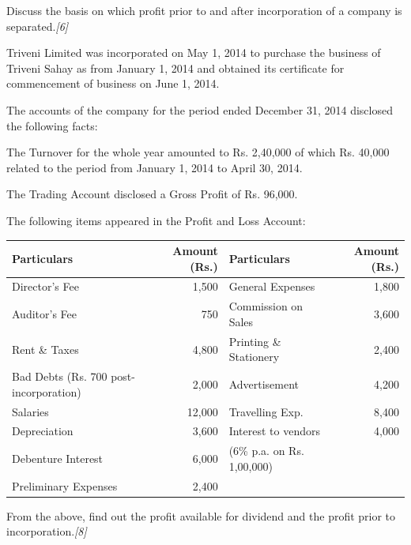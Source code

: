 \documentclass[11pt,a4paper]{article}
\newcommand{\pts}[1]{\hfill   \textit{[#1]}}
\begin{document}
\begin{parts}
  \item Discuss the basis on which profit prior to and after incorporation of a company is separated.\pts{6}
  \item Triveni Limited was incorporated on May 1, 2014 to purchase the business of Triveni Sahay as from January 1, 2014 and obtained its certificate for commencement of business on June 1, 2014.
  
  The accounts of the company for the period ended December 31, 2014 disclosed the following facts:
  
\begin{parts}
    \item The Turnover for the whole year amounted to Rs. 2,40,000 of which Rs. 40,000 related to the period from January 1, 2014 to April 30, 2014.
    \item The Trading Account disclosed a Gross Profit of Rs. 96,000.
    \item The following items appeared in the Profit and Loss Account:
    
\begin{center}
      \small
      
\begin{tabular}{|l|r||l|r|}
        \hline
   \textbf{Particulars} &   \textbf{Amount (Rs.)} &   \textbf{Particulars} &   \textbf{Amount (Rs.)} \\
        \hline
        Director's Fee & 1,500 & General Expenses & 1,800 \\
        Auditor's Fee & 750 & Commission on Sales & 3,600 \\
        Rent \& Taxes & 4,800 & Printing \& Stationery & 2,400 \\
        Bad Debts (Rs. 700 post-incorporation) & 2,000 & Advertisement & 4,200 \\
        Salaries & 12,000 & Travelling Exp. & 8,400 \\
        Depreciation & 3,600 & Interest to vendors & 4,000 \\
        Debenture Interest & 6,000 & (6\% p.a. on Rs. 1,00,000) & \\
        Preliminary Expenses & 2,400 & & \\
        \hline
      \end{tabular}
    \end{center}
  \end{parts}
  From the above, find out the profit available for dividend and the profit prior to incorporation.\pts{8}
\end{parts}
\end{document}
